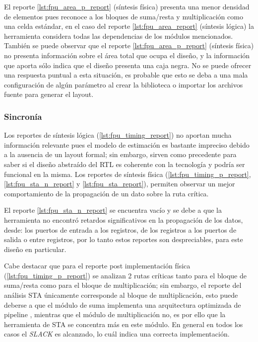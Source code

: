 El reporte \ref{lst:fpu_area_p_report} (síntesis física) presenta una menor densidad de elementos pues reconoce a los bloques de suma/resta y multiplicación como una celda estándar, en el caso del reporte \ref{lst:fpu_area_report} (síntesis lógica) la herramienta considera todas las dependencias de los módulos mencionados. También se puede observar que el reporte \ref{lst:fpu_area_p_report} (síntesis física) no presenta información sobre el área total que ocupa el diseño, y la información que aporta sólo indica que el diseño presenta una caja negra. No se puede ofrecer una respuesta puntual a esta situación, es probable que esto se deba a una mala configuración de algún parámetro al crear la biblioteca o importar los archivos fuente para generar el layout.

\subsubsection{Sincronía}

Los reportes de síntesis lógica (\ref{lst:fpu_timing_report}) no aportan mucha información relevante pues el modelo de estimación es bastante impreciso debido a la ausencia de un layout formal; sin embargo, sirven como precedente para saber si el diseño abstraído del RTL es coherente con la tecnología y podría ser funcional en la misma. Los reportes de síntesis física (\ref{lst:fpu_timing_p_report}, \ref{lst:fpu_sta_n_report} y \ref{lst:fpu_sta_report}), permiten observar un mejor comportamiento de la propagación de un dato sobre la ruta crítica.

El reporte \ref{lst:fpu_sta_n_report} se encuentra vacío y se debe a que la herramienta no encontró retardos significativos en la propagación de los datos, desde: los puertos de entrada a los registros, de los registros a los puertos de salida o entre registros, por lo tanto estos reportes son despreciables, para este diseño en particular.

Cabe destacar que para el reporte post implementación física (\ref{lst:fpu_timing_p_report}) se analizan 2 rutas críticas tanto para el bloque de suma/resta como para el bloque de multiplicación; sin embargo, el reporte del análisis STA únicamente corresponde al bloque de multiplicación, esto puede deberse a que el módulo de suma implementa una arquitectura optimizada de pipeline \cite{Francis2016}, mientras que el módulo de multiplicación no, es por ello que la herramienta de STA se concentra más en este módulo. En general en todos los casos el \textit{SLACK} es alcanzado, lo cuál indica una correcta implementación.


